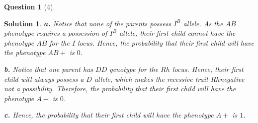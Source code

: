 \documentclass{article} %
\theoremstyle{quest}
\newtheorem*{question}{Question}
\newtheorem*{solution}{Solution}
\begin{document}
\bigskip

\begin{question}[4]
\end{question}
\begin{solution}
\textbf{a.} 
Notice that none of the parents possess $I^B$ allele. As the $AB$ phenotype requires 
a possession of $I^B$ allele, their first child cannot have the phenotype $AB$ for the
$I$ locus. Hence, the probability that their first child will have the phenotype $AB+$ is
$0$.

\smallskip

\textbf{b.} Notice that one parent has $DD$ genotype for the $Rh$ locus. Hence, their first
child will always possess a $D$ allele, which makes the recessive trait $Rh$negative not a
possibility. Therefore, the probability that their first child will have the phenotype $A-$
is $0$.

\smallskip

\textbf{c.} Hence, the probability that their first child will have the phenotype $A+$ is $1$.


\end{solution}
\end{document}
